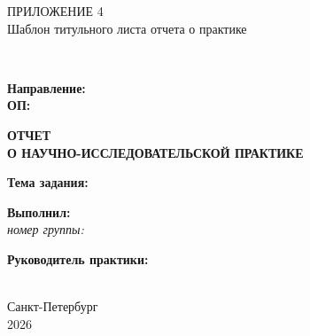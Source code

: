 \begin{center}
{\large ПРИЛОЖЕНИЕ 4}\\[0.5em]
Шаблон титульного листа отчета о практике
\end{center}

\vspace{1.5em}

\begin{center}
\textbf{\MakeUppercase{\UniversityName}}\\[1.5em]
\begin{flushleft}
\textbf{Направление:} \DirectionName\\
\textbf{ОП:} \ProgramName
\end{flushleft}

\vspace{3.5cm}

{\Large\bfseries ОТЧЕТ\\[0.4em]О НАУЧНО-ИССЛЕДОВАТЕЛЬСКОЙ ПРАКТИКЕ}
\end{center}

\vspace{2.5cm}

\noindent\textbf{Тема задания:} \PracticeTheme

\vspace{3cm}

\begin{flushright}
\begin{minipage}{0.58\textwidth}
\textbf{Выполнил:} \StudentName\\
\textit{номер группы:} \StudentGroup

\vspace{1.5em}

\textbf{Руководитель практики:}\\
\SupervisorName\\
\SupervisorRole
\end{minipage}
\end{flushright}

\vfill

\begin{center}
Санкт-Петербург\\
2026
\end{center}
